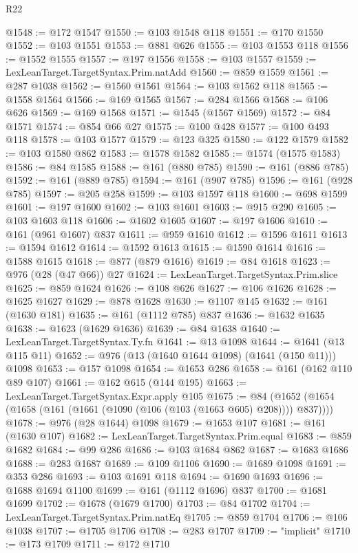 \begin{lexlean}{R22}
\begin{coremodule}
@1548 := @172 @1547
@1550 := @103 @1548 @118
@1551 := @170 @1550
@1552 := @103 @1551
@1553 := @881 @626
@1555 := @103 @1553 @118
@1556 := @1552 @1555
@1557 := @197 @1556
@1558 := @103 @1557
@1559 := LexLeanTarget.TargetSyntax.Prim.natAdd
@1560 := @859 @1559
@1561 := @287 @1038
@1562 := @1560 @1561
@1564 := @103 @1562 @118
@1565 := @1558 @1564
@1566 := @169 @1565
@1567 := @284 @1566
@1568 := @106 @626
@1569 := @169 @1568
@1571 := @1545 (@1567 @1569)
@1572 := @84 @1571
@1574 := @854 @66 @27
@1575 := @100 @428
@1577 := @100 @493 @118
@1578 := @103 @1577
@1579 := @123 @325
@1580 := @122 @1579
@1582 := @103 @1580 @862
@1583 := @1578 @1582
@1585 := @1574 (@1575 @1583)
@1586 := @84 @1585
@1588 := @161 (@880 @785)
@1590 := @161 (@886 @785)
@1592 := @161 (@889 @785)
@1594 := @161 (@907 @785)
@1596 := @161 (@928 @785)
@1597 := @205 @258
@1599 := @103 @1597 @118
@1600 := @698 @1599
@1601 := @197 @1600
@1602 := @103 @1601
@1603 := @915 @290
@1605 := @103 @1603 @118
@1606 := @1602 @1605
@1607 := @197 @1606
@1610 := @161 (@961 @1607) @837
@1611 := @959 @1610
@1612 := @1596 @1611
@1613 := @1594 @1612
@1614 := @1592 @1613
@1615 := @1590 @1614
@1616 := @1588 @1615
@1618 := @877 (@879 @1616)
@1619 := @84 @1618
@1623 := @976 (@28 (@47 @66)) @27
@1624 := LexLeanTarget.TargetSyntax.Prim.slice
@1625 := @859 @1624
@1626 := @108 @626
@1627 := @106 @1626
@1628 := @1625 @1627
@1629 := @878 @1628
@1630 := @1107 @145
@1632 := @161 (@1630 @181)
@1635 := @161 (@1112 @785) @837
@1636 := @1632 @1635
@1638 := @1623 (@1629 @1636)
@1639 := @84 @1638
@1640 := LexLeanTarget.TargetSyntax.Ty.fn
@1641 := @13 @1098
@1644 := @1641 (@13 @115 @11)
@1652 := @976 (@13 (@1640 @1644 @1098) (@1641 (@150 @11))) @1098
@1653 := @157 @1098
@1654 := @1653 @286
@1658 := @161 (@162 @110 @89 @107)
@1661 := @162 @615 (@144 @195)
@1663 := LexLeanTarget.TargetSyntax.Expr.apply @105
@1675 := @84 (@1652 (@1654 (@1658 (@161 (@1661 (@1090 (@106 (@103 (@1663 @605) @208)))) @837))))
@1678 := @976 (@28 @1644) @1098
@1679 := @1653 @107
@1681 := @161 (@1630 @107)
@1682 := LexLeanTarget.TargetSyntax.Prim.equal
@1683 := @859 @1682
@1684 := @99 @286
@1686 := @103 @1684 @862
@1687 := @1683 @1686
@1688 := @283 @1687
@1689 := @109 @1106
@1690 := @1689 @1098
@1691 := @353 @286
@1693 := @103 @1691 @118
@1694 := @1690 @1693
@1696 := @1688 @1694 @1100
@1699 := @161 (@1112 @1696) @837
@1700 := @1681 @1699
@1702 := @1678 (@1679 @1700)
@1703 := @84 @1702
@1704 := LexLeanTarget.TargetSyntax.Prim.natEq
@1705 := @859 @1704
@1706 := @106 @1038
@1707 := @1705 @1706
@1708 := @283 @1707
@1709 := "implicit"
@1710 := @173 @1709
@1711 := @172 @1710

\end{coremodule}
\end{lexlean}
